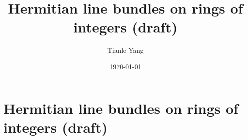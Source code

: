 \documentclass{noteformyself}
\title{Hermitian line bundles on rings of integers (draft)}
\author{Tianle Yang}
\date{\today}
\begin{document}
    \maketitle

    \section{Hermitian line bundles on rings of integers (draft)}



\end{document}
